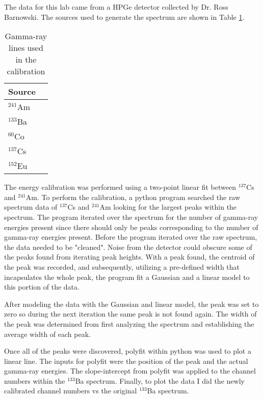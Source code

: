 The data for this lab came from a HPGe detector collected by Dr. Ross Barnowski.
The sources used to generate the spectrum are shown in Table \ref{table:source}.

\begin{table}[H]
  \begin{center}
    \begin{tabular}{l|r}
      \textbf{Source}\\
      \hline
      $^{241}$Am\\
      $^{133}$Ba\\
      $^{60}$Co\\
      $^{137}$Cs\\
      $^{152}$Eu\\
    \end{tabular}
    \caption{Gamma-ray lines used in the calibration}
    \label{table:source}
  \end{center}
\end{table}

The energy calibration was performed using a two-point linear fit between
$^{137}$Cs and $^{241}$Am. To perform the calibration, a python program searched
the raw spectrum data of $^{137}$Cs and $^{241}$Am looking for
the largest peaks within the spectrum. The program iterated over the spectrum for the
number of gamma-ray energies present since there should only be peaks corresponding
to the number of gamma-ray energies present. Before the program iterated over the raw spectrum,
the data needed to be "cleaned". Noise from the detector could obscure some of the peaks
found from iterating peak heights. With a peak found, the centroid of the peak was
recorded, and subsequently, utilizing a pre-defined width that incapsulates
the whole peak, the program fit a Gaussian and a linear model to this portion of the data.

After modeling the data with the Gaussian and linear model, the peak was
set to zero so during the next iteration the same peak is not found again.
The width of the peak was determined from first analyzing the spectrum and establishing
the average width of each peak.

Once all of the peaks were discovered, polyfit within python was used to
plot a linear line. The inputs for polyfit were the position of the peak and
the actual gamma-ray energies. The slope-intercept from polyfit was applied
to the channel numbers within the $^{133}$Ba spectrum. Finally, to plot the data
I did the newly calibrated channel numbers vs the original $^{133}$Ba spectrum.
